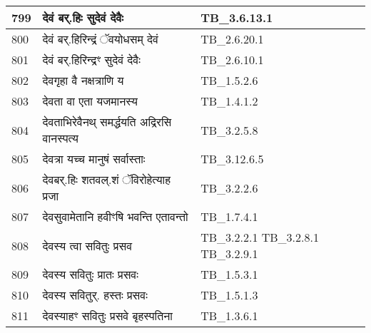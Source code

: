 \documentclass[17pt]{extarticle}
\begin{document}
\begin{longtable}{||p{0.4in}||p{4.9in}||p{0.9in}||}
    \hline
        
    799 & देवं बर्.हिः सुदेवं देवैः & TB\_3.6.13.1       \\
    
    \hline
        
    800 & देवं बर्.हिरिन्द्रं ॅवयोधसम् देवं & TB\_2.6.20.1       \\
    
    \hline
        
    801 & देवं बर्.हिरिन्द्रꣳ सुदेवं देवैः & TB\_2.6.10.1       \\
    
    \hline
        
    802 & देवगृहा वै नक्षत्राणि य & TB\_1.5.2.6       \\
    
    \hline
        
    803 & देवता वा एता यजमानस्य & TB\_1.4.1.2       \\
    
    \hline
        
    804 & देवताभिरेवैनथ् समर्द्धयति अद्रिरसि वानस्पत्य & TB\_3.2.5.8       \\
    
    \hline
        
    805 & देवत्रा यच्च मानुषं सर्वास्ताः & TB\_3.12.6.5       \\
    
    \hline
        
    806 & देवबर्.हिः शतवल्.शं ॅविरोहेत्याह प्रजा & TB\_3.2.2.6       \\
    
    \hline
        
    807 & देवसुवामेतानि हवीꣳषि भवन्ति एतावन्तो & TB\_1.7.4.1       \\
    
    \hline
        
    808 & देवस्य त्वा सवितुः प्रसव & TB\_3.2.2.1 TB\_3.2.8.1 TB\_3.2.9.1       \\
    
    \hline
        
    809 & देवस्य सवितुः प्रातः प्रसवः & TB\_1.5.3.1       \\
    
    \hline
        
    810 & देवस्य सवितुर्. हस्तः प्रसवः & TB\_1.5.1.3       \\
    
    \hline
        
    811 & देवस्याहꣳ सवितुः प्रसवे बृहस्पतिना & TB\_1.3.6.1       \\
    

\end{longtable}
\end{document}
